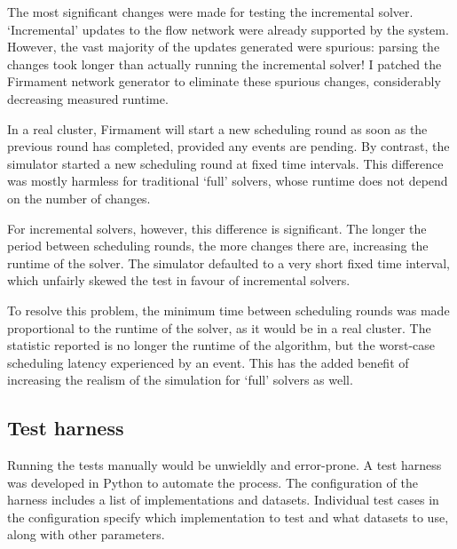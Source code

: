 The most significant changes were made for testing the incremental solver. `Incremental' updates to the flow network were already supported by the system. However, the vast majority of the updates generated were spurious: parsing the changes took longer than actually running the incremental solver! I patched the Firmament network generator to eliminate these spurious changes, considerably decreasing measured runtime.

In a real cluster, Firmament will start a new scheduling round as soon as the previous round has completed, provided any events are pending. By contrast, the simulator started a new scheduling round at fixed time intervals. This difference was mostly harmless for traditional `full' solvers, whose runtime does not depend on the number of changes. 

For incremental solvers, however, this difference is significant. The longer the period between scheduling rounds, the more changes there are, increasing the runtime of the solver. The simulator defaulted to a very short fixed time interval, which unfairly skewed the test in favour of incremental solvers. 

To resolve this problem, the minimum time between scheduling rounds was made proportional to the runtime of the solver, as it would be in a real cluster. The statistic reported is no longer the runtime of the algorithm, but the worst-case scheduling latency experienced by an event\footnotemark. This has the added benefit of increasing the realism of the simulation for `full' solvers as well.


\subsection{Test harness} \label{sec:impl-benchmark-harness}

Running the tests manually would be unwieldly and error-prone. A test harness was developed in Python to automate the process. The configuration of the harness includes a list of implementations and datasets. Individual test cases in the configuration specify which implementation to test and what datasets to use, along with other parameters.


